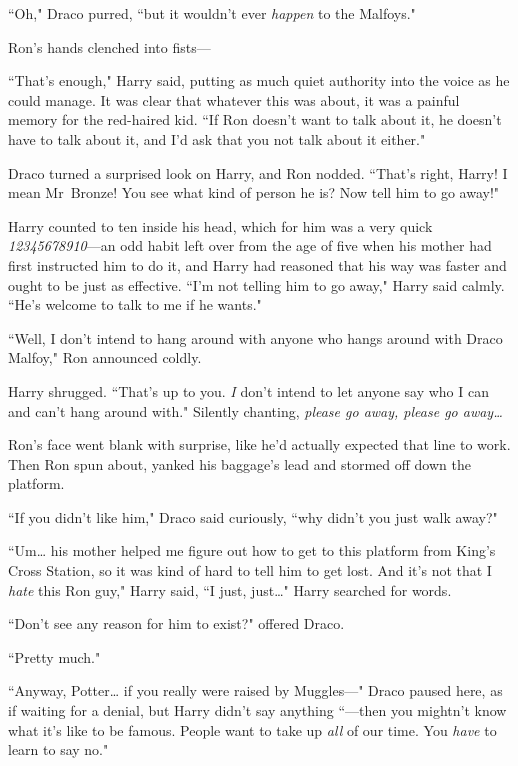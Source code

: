 ``Oh," Draco purred, ``but it wouldn't ever \emph{happen} to the Malfoys."

Ron's hands clenched into fists—

``That's enough," Harry said, putting as much quiet authority into the voice as he could manage. It was clear that whatever this was about, it was a painful memory for the red-haired kid. ``If Ron doesn't want to talk about it, he doesn't have to talk about it, and I'd ask that you not talk about it either."

Draco turned a surprised look on Harry, and Ron nodded. ``That's right, Harry! I mean Mr~Bronze! You see what kind of person he is? Now tell him to go away!"

Harry counted to ten inside his head, which for him was a very quick \emph{12345678910}—an odd habit left over from the age of five when his mother had first instructed him to do it, and Harry had reasoned that his way was faster and ought to be just as effective. ``I'm not telling him to go away," Harry said calmly. ``He's welcome to talk to me if he wants."

``Well, I don't intend to hang around with anyone who hangs around with Draco Malfoy," Ron announced coldly.

Harry shrugged. ``That's up to you. \emph{I} don't intend to let anyone say who I can and can't hang around with." Silently chanting, \emph{please go away, please go away{\ldots}}

Ron's face went blank with surprise, like he'd actually expected that line to work. Then Ron spun about, yanked his baggage's lead and stormed off down the platform.

``If you didn't like him," Draco said curiously, ``why didn't you just walk away?"

``Um{\ldots} his mother helped me figure out how to get to this platform from King's Cross Station, so it was kind of hard to tell him to get lost. And it's not that I \emph{hate} this Ron guy," Harry said, ``I just, just{\ldots}" Harry searched for words.

``Don't see any reason for him to exist?" offered Draco.

``Pretty much."

``Anyway, Potter{\ldots} if you really were raised by Muggles—" Draco paused here, as if waiting for a denial, but Harry didn't say anything ``—then you mightn't know what it's like to be famous. People want to take up \emph{all} of our time. You \emph{have} to learn to say no."


